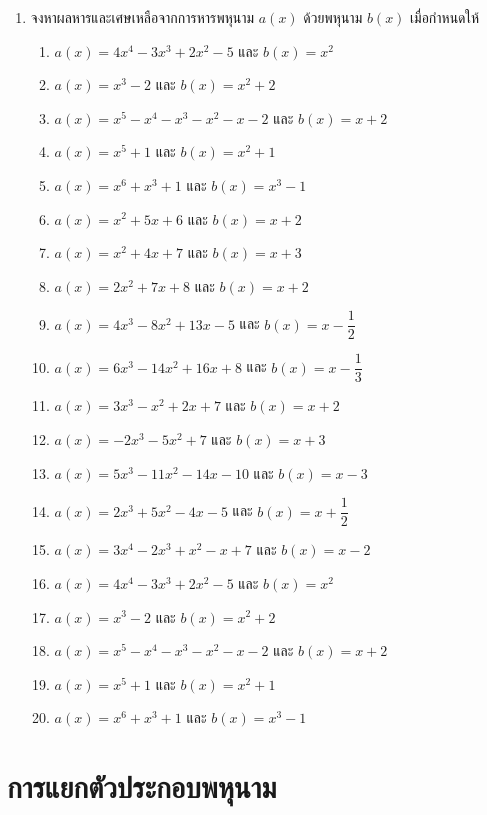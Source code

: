 \begin{enumerate}[label=\arabic*., leftmargin=*, itemsep=0.6em]
	\item จงหาผลหารและเศษเหลือจากการหารพหุนาม $a(x)$ ด้วยพหุนาม $b(x)$ เมื่อกำหนดให้
	\begin{enumerate}[label=\theenumi\arabic*), leftmargin=2em, itemsep=0.5em]
		\everymath{\displaystyle}
		\item $a(x) = 4x^4 - 3x^3 + 2x^2 - 5$ และ $b(x) = x^2$
		\item $a(x) = x^3 - 2$ และ $b(x) = x^2 + 2$
		\item $a(x) = x^5 - x^4 - x^3 - x^2 - x - 2$ และ $b(x) = x + 2$
		\item $a(x) = x^5 + 1$ และ $b(x) = x^2 + 1$
		\item $a(x) = x^6 + x^3 + 1$ และ $b(x) = x^3 - 1$
		\item $a(x) = x^2 + 5x + 6$ และ $b(x) = x + 2$
		\item $a(x) = x^2 + 4x + 7$ และ $b(x) = x + 3$
		\item $a(x) = 2x^2 + 7x + 8$ และ $b(x) = x + 2$
		\item $a(x) = 4x^3 - 8x^2 + 13x - 5$ และ $b(x) = x - \dfrac{1}{2}$
		\item $a(x) = 6x^3 - 14x^2 + 16x + 8$ และ $b(x) = x - \dfrac{1}{3}$
		\item $a(x) = 3x^3 - x^2 + 2x + 7$ และ $b(x) = x + 2$
		\item $a(x) = -2x^3 - 5x^2 + 7$ และ $b(x) = x + 3$
		\item $a(x) = 5x^3 - 11x^2 - 14x - 10$ และ $b(x) = x - 3$
		\item $a(x) = 2x^3 + 5x^2 - 4x - 5$ และ $b(x) = x + \dfrac{1}{2}$
		\item $a(x) = 3x^4 - 2x^3 + x^2 - x + 7$ และ $b(x) = x - 2$
		\item $a(x) = 4x^4 - 3x^3 + 2x^2 - 5$ และ $b(x) = x^2$
		\item $a(x) = x^3 - 2$ และ $b(x) = x^2 + 2$
		\item $a(x) = x^5 - x^4 - x^3 - x^2 - x - 2$ และ $b(x) = x + 2$
		\item $a(x) = x^5 + 1$ และ $b(x) = x^2 + 1$
		\item $a(x) = x^6 + x^3 + 1$ และ $b(x) = x^3 - 1$
	\end{enumerate}
\end{enumerate}

\newpage
\section{การแยกตัวประกอบพหุนาม}

